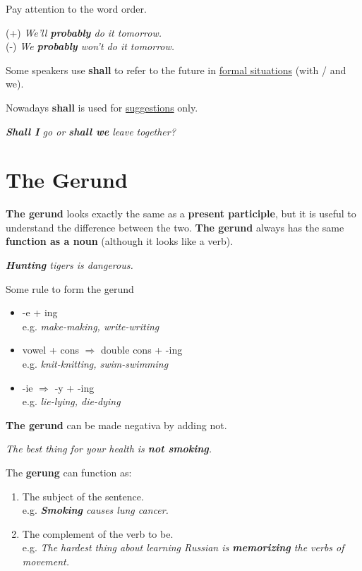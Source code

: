 \documentclass[hidelinks,10pt,a4paper]{article}
\begin{document}
Pay attention to the word order.

\begin{center}
	(+) \textit{We'll \textbf{probably} do it tomorrow.} \\
	(-) \textit{We \textbf{probably} won't do it tomorrow.}
\end{center}

Some speakers use \textbf{shall} to refer to the future in \underline{formal situations} (with / and we).

Nowadays \textbf{shall} is used for \underline{suggestions} only.

\begin{center}
	\textit{ \textbf{Shall I} go or \textbf{shall we} leave together? }
\end{center}

\section{The Gerund}
\textbf{The gerund}  looks exactly the same as a \textbf{present participle}, but it is useful to understand the difference between the two. \textbf{The gerund} always has the same \textbf{function as a noun} (although it looks like a verb).

\begin{center}
	\textit{ \textbf{Hunting} tigers is dangerous.}
\end{center}

Some rule to form the gerund
\begin{itemize}
	\item -e + ing \\
		e.g. \textit{make-making, write-writing}
	\item vowel + cons $\Rightarrow$ double cons + -ing \\
		e.g. \textit{knit-knitting, swim-swimming}
	\item -ie $\Rightarrow$ -y + -ing \\
		e.g. \textit{lie-lying, die-dying}
\end{itemize}

\textbf{The gerund} can be made negativa by adding not.

\begin{center}
	\textit{The best thing for your health is \textbf{not smoking}. }
\end{center}

The \textbf{gerung} can function as:

\begin{enumerate}[label=(\alph*)]
	\item The subject of the sentence. \\
		e.g. \textit{ \textbf{Smoking} causes lung cancer.}
	\item The complement of the verb to be. \\
		e.g. \textit{The hardest thing about learning Russian is \textbf{memorizing} the verbs of movement. }
\end{enumerate}
\end{document}
